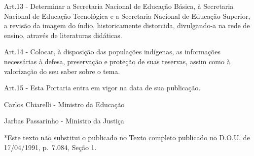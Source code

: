 \documentclass[
]{book}
\begin{document}
Art.13 - Determinar a Secretaria Nacional de Educação Básica, à Secretaria Nacional de Educação Tecnológica e a Secretaria Nacional de Educação Superior, a revisão da imagem do índio, historicamente distorcida, divulgando-a na rede de ensino, através de literaturas didáticas.

Art.14 - Colocar, à disposição das populações indígenas, as informações necessárias à defesa, preservação e proteção de suas reservas, assim como à valorização do seu saber sobre o tema.

Art.15 - Esta Portaria entra em vigor na data de sua publicação.

Carlos Chiarelli - Ministro da Educação

Jarbas Passarinho - Ministro da Justiça

*Este texto não substitui o publicado no Texto completo publicado no D.O.U. de 17/04/1991, p.~7.084, Seção 1.

  
\end{document}
